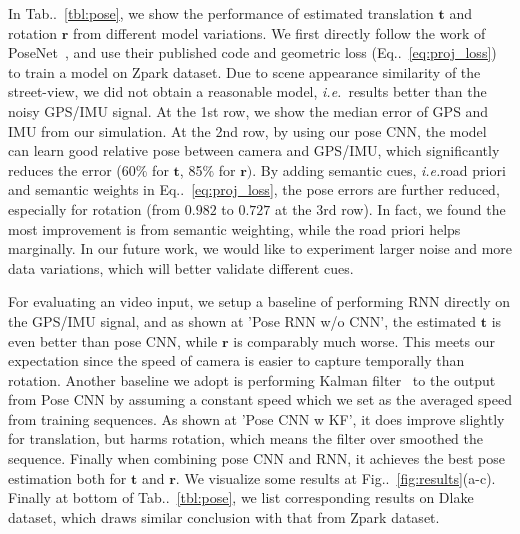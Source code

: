 \documentclass[10pt,twocolumn,letterpaper]{article}
\makeatletter
\newcommand{\figref}[1]{Fig\onedot~\ref{#1}}
\newcommand{\equref}[1]{Eq\onedot~\eqref{#1}}
\newcommand{\tabref}[1]{Tab\onedot~\ref{#1}}
\newcommand{\ve}[1]{{\mathbf #1}} %
\DeclareRobustCommand\onedot{\futurelet\@let@token\@onedot}
\def\onedot{\ifx\@let@token.\else.\null\fi\xspace}
\def\ie{\emph{i.e.}}
\makeatother
\begin{document}
In \tabref{tbl:pose}, we show the performance of estimated translation $\ve{t}$ and rotation $\ve{r}$ from different model variations. 
We first directly follow the work of PoseNet~\cite{Kendall_2015_ICCV,kendall2017geometric}, and use their published code and geometric loss (\equref{eq:proj_loss}) to train a model on Zpark dataset. 
Due to scene appearance similarity of the street-view, we did not obtain a reasonable model, \ie~results better than the noisy GPS/IMU signal.
At the 1st row, we show the median error of GPS and IMU from our simulation. 
At the 2nd row, by using our pose CNN, the model can learn good relative pose between camera and GPS/IMU, which significantly reduces the error (60$\%$ for $\ve{t}$, 85$\%$ for $\ve{r})$. 
By adding semantic cues, \ie road priori and semantic weights in \equref{eq:proj_loss}, the pose errors are further reduced, especially for rotation (from $0.982$ to $0.727$ at the 3rd row). In fact, we found the most improvement is from semantic weighting, while the road priori helps marginally. In our future work, we would like to experiment larger noise and more data variations, which will better validate different cues.

For evaluating an video input, we setup a baseline of performing RNN directly on the GPS/IMU signal, and as shown at 'Pose RNN w/o CNN', the estimated $\ve{t}$ is even better than pose CNN, while $\ve{r}$ is comparably much worse. This meets our expectation since the speed of camera is easier to capture temporally than rotation. Another baseline we adopt is performing Kalman filter~\cite{kalman1960new} to the output from Pose CNN by assuming a constant speed which we set as the averaged speed from training sequences. As shown at 'Pose CNN w KF', it does improve slightly for translation, but harms rotation, which means the filter over smoothed the sequence. Finally when combining pose CNN and RNN, it achieves the best pose estimation both for $\ve{t}$ and $\ve{r}$. We visualize some results at \figref{fig:results}(a-c).
Finally at bottom of \tabref{tbl:pose}, we list corresponding results on Dlake dataset, which draws similar conclusion with that from Zpark dataset.
\end{document}
